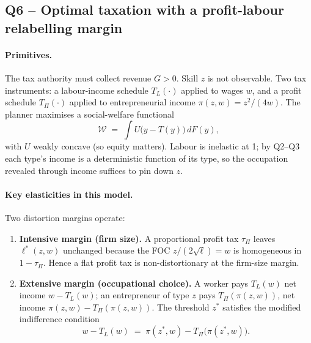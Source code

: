 \documentclass[11pt,a4paper]{article}
\begin{document}
\subsection*{Q6 -- Optimal taxation with a profit-labour relabelling margin}

\paragraph{Primitives.}
The tax authority must collect revenue $G>0$. Skill $z$ is not observable. Two tax instruments: a labour-income schedule $T_{L}(\cdot)$ applied to wages $w$, and a profit schedule $T_{\Pi}(\cdot)$ applied to entrepreneurial income $\pi(z,w)=z^{2}/(4w)$. The planner maximises a social-welfare functional
\[
\mathcal{W}\;=\;\int U\bigl(y-T(y)\bigr)\,dF(y),
\]
with $U$ weakly concave (so equity matters). Labour is inelastic at 1; by Q2--Q3 each type's income is a deterministic function of its type, so the occupation revealed through income suffices to pin down $z$.

\paragraph{Key elasticities in this model.}
Two distortion margins operate:
\begin{enumerate}[leftmargin=*,itemsep=1pt]
    \item \textbf{Intensive margin (firm size).} A proportional profit tax $\tau_{\Pi}$ leaves $\ell^{*}(z,w)$ unchanged because the FOC $z/(2\sqrt{\ell})=w$ is homogeneous in $1-\tau_{\Pi}$. Hence a flat profit tax is non-distortionary at the firm-size margin.
    \item \textbf{Extensive margin (occupational choice).} A worker pays $T_{L}(w)$ net income $w-T_{L}(w)$; an entrepreneur of type $z$ pays $T_{\Pi}(\pi(z,w))$, net income $\pi(z,w)-T_{\Pi}(\pi(z,w))$. The threshold $z^{*}$ satisfies the modified indifference condition
    \[
    w-T_{L}(w)\;=\;\pi(z^{*},w)-T_{\Pi}\bigl(\pi(z^{*},w)\bigr).
    \]
\end{enumerate}
\end{document}
